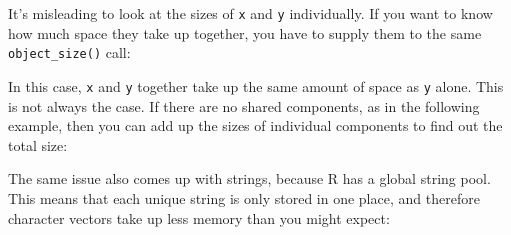 It's misleading to look at the sizes of \texttt{x} and \texttt{y}
individually. If you want to know how much space they take up together,
you have to supply them to the same \texttt{object\_size()} call:

\begin{Shaded}
\begin{Highlighting}[]
\end{Highlighting}
\end{Shaded}

In this case, \texttt{x} and \texttt{y} together take up the same amount
of space as \texttt{y} alone. This is not always the case. If there are
no shared components, as in the following example, then you can add up
the sizes of individual components to find out the total size:

\begin{Shaded}
\begin{Highlighting}[]
\StringTok{ }\NormalTok{:}
\StringTok{ }\NormalTok{(}\NormalTok{:}\NormalTok{, }\NormalTok{:}\NormalTok{, }\NormalTok{:}\NormalTok{)}

\StringTok{ }\StringTok{ }
\end{Highlighting}
\end{Shaded}

The same issue also comes up with strings, because R has a global string
pool. This means that each unique string is only stored in one place,
and therefore character vectors take up less memory than you might
expect: 

\begin{Shaded}
\begin{Highlighting}[]
\NormalTok{(}\NormalTok{)}
\NormalTok{(}\NormalTok{(}\NormalTok{, }\NormalTok{))}
\end{Highlighting}
\end{Shaded}

